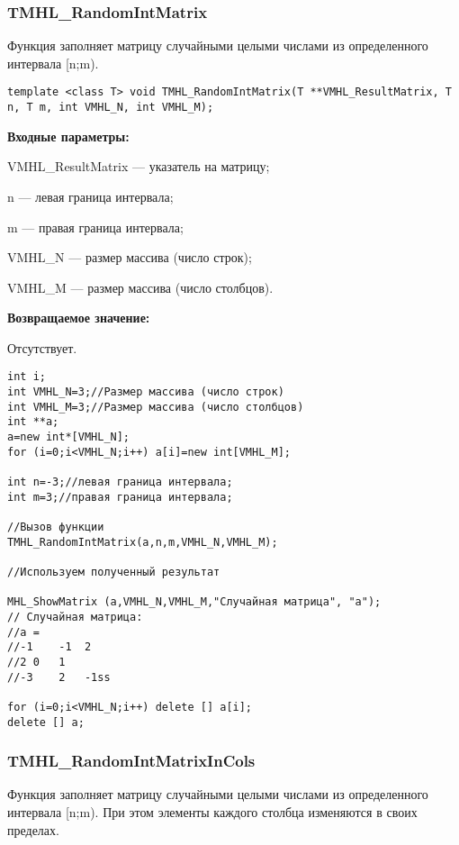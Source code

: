 \documentclass[a4paper,12pt]{article}
\begin{document}
\subsubsection{TMHL\_RandomIntMatrix}\label{TMHL_RandomIntMatrix}

Функция заполняет матрицу случайными целыми числами из определенного интервала [n;m).


\begin{lstlisting}[label=code_syntax_TMHL_RandomIntMatrix,caption=Синтаксис]
template <class T> void TMHL_RandomIntMatrix(T **VMHL_ResultMatrix, T n, T m, int VMHL_N, int VMHL_M);
\end{lstlisting}

\textbf{Входные параметры:}
 
VMHL\_ResultMatrix --- указатель на матрицу;
 
n --- левая граница интервала;
 
m --- правая граница интервала;
 
VMHL\_N --- размер массива (число строк);
 
VMHL\_M --- размер массива (число столбцов).

\textbf{Возвращаемое значение:}

Отсутствует.


\begin{lstlisting}[label=code_use_TMHL_RandomIntMatrix,caption=Пример использования]
int i;
int VMHL_N=3;//Размер массива (число строк)
int VMHL_M=3;//Размер массива (число столбцов)
int **a;
a=new int*[VMHL_N];
for (i=0;i<VMHL_N;i++) a[i]=new int[VMHL_M];

int n=-3;//левая граница интервала;
int m=3;//правая граница интервала;

//Вызов функции
TMHL_RandomIntMatrix(a,n,m,VMHL_N,VMHL_M);

//Используем полученный результат

MHL_ShowMatrix (a,VMHL_N,VMHL_M,"Случайная матрица", "a");
// Случайная матрица:
//a =
//-1	-1	2
//2	0	1
//-3	2	-1ss

for (i=0;i<VMHL_N;i++) delete [] a[i];
delete [] a;
\end{lstlisting}

\subsubsection{TMHL\_RandomIntMatrixInCols}\label{TMHL_RandomIntMatrixInCols}

Функция заполняет матрицу случайными целыми числами из определенного интервала [n;m). При этом элементы каждого столбца изменяются в своих пределах.
\end{document}
